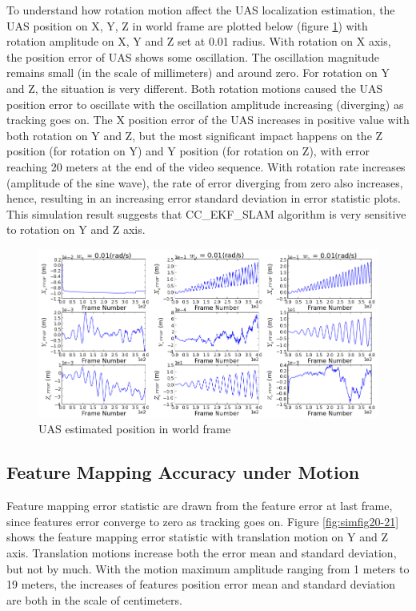 To understand how rotation motion affect the UAS localization
estimation, the UAS position on X, Y, Z in world frame are plotted
below (figure \ref{fig:simfig14}) with rotation amplitude on X, Y and
Z set at 0.01 radius. With rotation on X axis, the position error of
UAS shows some oscillation. The oscillation magnitude remains small
(in the scale of millimeters) and around zero. For rotation on Y and
Z, the situation is very different. Both rotation motions caused the
UAS position error to oscillate with the oscillation amplitude
increasing (diverging) as tracking goes on. The X position error of
the UAS increases in positive value with both rotation on Y and Z, but
the most significant impact happens on the Z position (for rotation on
Y) and Y position (for rotation on Z), with error reaching 20 meters
at the end of the video sequence. With rotation rate increases
(amplitude of the sine wave), the rate of error diverging from zero
also increases, hence, resulting in an increasing error standard
deviation in error statistic plots. This simulation result suggests
that CC\_EKF\_SLAM algorithm is very sensitive to rotation on Y and Z
axis.

\begin{figure}[h]
  \centering
  \includegraphics[width=14cm, keepaspectratio=true]{./Figures/SimulationFigures/Figure14.png}
  \caption{UAS estimated position in world frame}
  \label{fig:simfig14}
\end{figure}

\subsection{Feature Mapping Accuracy under Motion}

Feature mapping error statistic are drawn from the feature error at last 
frame, since features error converge to zero as tracking goes on. 
Figure \ref{fig:simfig20-21} shows the feature mapping error statistic 
with translation motion on Y and Z axis. Translation motions increase 
both the error mean and standard deviation, but not by much. With the 
motion maximum amplitude ranging from 1 meters to 19 meters, the 
increases of features position error mean and standard deviation are 
both in the scale of centimeters.

